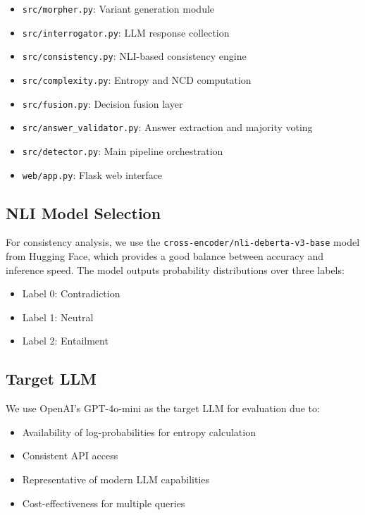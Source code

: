 \begin{itemize}
    \item \texttt{src/morpher.py}: Variant generation module
    \item \texttt{src/interrogator.py}: LLM response collection
    \item \texttt{src/consistency.py}: NLI-based consistency engine
    \item \texttt{src/complexity.py}: Entropy and NCD computation
    \item \texttt{src/fusion.py}: Decision fusion layer
    \item \texttt{src/answer\_validator.py}: Answer extraction and majority voting
    \item \texttt{src/detector.py}: Main pipeline orchestration
    \item \texttt{web/app.py}: Flask web interface
\end{itemize}

\subsection{NLI Model Selection}

For consistency analysis, we use the \texttt{cross-encoder/nli-deberta-v3-base} model from Hugging Face, which provides a good balance between accuracy and inference speed. The model outputs probability distributions over three labels:

\begin{itemize}
    \item Label 0: Contradiction
    \item Label 1: Neutral
    \item Label 2: Entailment
\end{itemize}

\subsection{Target LLM}

We use OpenAI's GPT-4o-mini as the target LLM for evaluation due to:

\begin{itemize}
    \item Availability of log-probabilities for entropy calculation
    \item Consistent API access
    \item Representative of modern LLM capabilities
    \item Cost-effectiveness for multiple queries
\end{itemize}


